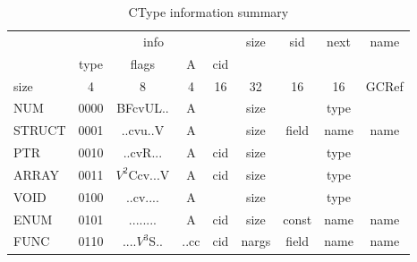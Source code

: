 \begin{table}[p]
\footnotesize
\centering
\caption{CType information summary}
\label{tab:ffi-ctype}
\begin{tabular}{l|c|c|c|c|c|l|c|c|c|c|}
\cline{2-11}
                               & \multicolumn{6}{c|}{info}                                                         & \multirow{2}{*}{size} & \multirow{2}{*}{sid} & \multirow{2}{*}{next} & \multirow{2}{*}{name} \\ \cline{2-7}
                               & type & \multicolumn{2}{c|}{flags}          & A         & \multicolumn{2}{c|}{cid} &                       &                      &                       &                       \\ \hline
\multicolumn{1}{|l|}{size}     & 4    & \multicolumn{2}{c|}{8}              & 4         & \multicolumn{2}{c|}{16}  & 32                    & 16                   & 16                    & GCRef                 \\ \hline
\multicolumn{1}{|l|}{NUM}      & 0000 & \multicolumn{2}{c|}{BFcvUL..}       & A         & \multicolumn{2}{c|}{}    & size                  &                      & type                  &                       \\
\multicolumn{1}{|l|}{STRUCT}   & 0001 & \multicolumn{2}{c|}{..cvu..V}       & A         & \multicolumn{2}{c|}{}    & size                  & field                & name                  & name                  \\
\multicolumn{1}{|l|}{PTR}      & 0010 & \multicolumn{2}{c|}{..cvR...}       & A         & \multicolumn{2}{c|}{cid} & size                  &                      & type                  &                       \\
\multicolumn{1}{|l|}{ARRAY}    & 0011 & \multicolumn{2}{c|}{$V^2$Ccv...V}   & A         & \multicolumn{2}{c|}{cid} & size                  &                      & type                  &                       \\
\multicolumn{1}{|l|}{VOID}     & 0100 & \multicolumn{2}{c|}{..cv....}       & A         & \multicolumn{2}{c|}{}    & size                  &                      & type                  &                       \\
\multicolumn{1}{|l|}{ENUM}     & 0101 & \multicolumn{2}{c|}{........}       & A         & \multicolumn{2}{c|}{cid} & size                  & const                & name                  & name                  \\
\multicolumn{1}{|l|}{FUNC}     & 0110 & \multicolumn{2}{c|}{....$V^3$S..}   & ..cc      & \multicolumn{2}{c|}{cid} & nargs                 & field                & name                  & name                  \\

\end{tabular}
\end{table}
